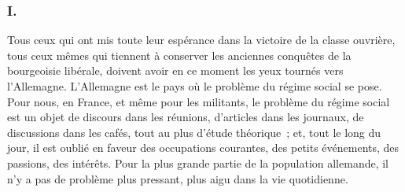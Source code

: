 \documentclass[french,twoside]{book} %
\begin{document}
\subsubsection[{I.}]{I.}
\noindent Tous ceux qui ont mis toute leur espérance dans la victoire de la classe ouvrière, tous ceux mêmes qui tiennent à conserver les anciennes conquêtes de la bourgeoisie libérale, doivent avoir en ce moment les yeux tournés vers l'Allemagne. L'Allemagne est le pays où le problème du régime social se pose. Pour nous, en France, et même pour les militants, le problème du régime social est un objet de discours dans les réunions, d'articles dans les journaux, de discussions dans les cafés, tout au plus d'étude théorique ; et, tout le long du jour, il est oublié en faveur des occupations courantes, des petits événe­ments, des passions, des intérêts. Pour la plus grande partie de la population allemande, il n'y a pas de problème plus pressant, plus aigu dans la vie quotidienne.\par
\end{document}
